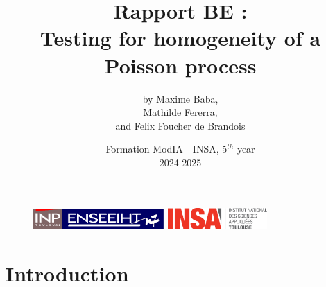 \documentclass[12pt,a4paper]{article}
\begin{document}
\begin{figure}[t]
    \centering
    \includegraphics[width=5cm]{src/inp_n7.png}
    \hfill
    \includegraphics[width=3.8cm]{src/insa_toulouse.png}
\end{figure}


\title{\vspace{4cm} \textbf{Rapport BE : \\ 
Testing for homogeneity of a Poisson process}}

\author{by Maxime Baba, \\
        Mathilde Fererra, \\
        and Felix Foucher de Brandois}
        
\date{\vfill Formation ModIA - INSA, 5$^{th}$ year \\
2024-2025}

\maketitle

\newpage
\tableofcontents
\listoffigures

\newpage


\section{Introduction}
\end{document}
